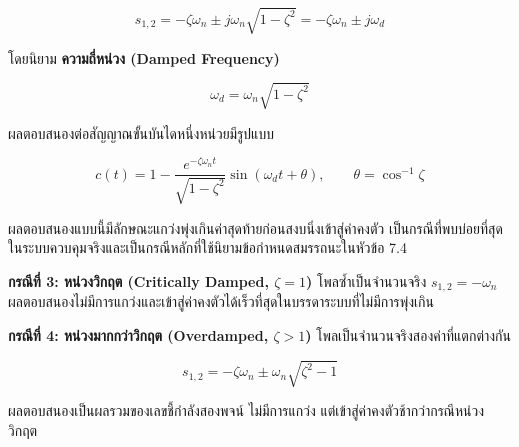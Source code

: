 \[
s_{1,2} = -\zeta\omega_n \pm j\omega_n\sqrt{1-\zeta^2} = -\zeta\omega_n \pm j\omega_d
\]

โดยนิยาม \textbf{ความถี่หน่วง (Damped Frequency)}

\[
\omega_d = \omega_n\sqrt{1-\zeta^2}
\]

ผลตอบสนองต่อสัญญาณขั้นบันไดหนึ่งหน่วยมีรูปแบบ

\[
c(t) = 1 - \frac{e^{-\zeta\omega_n t}}{\sqrt{1-\zeta^2}}\sin(\omega_d t + \theta), \qquad \theta = \cos^{-1}\zeta
\]

ผลตอบสนองแบบนี้มีลักษณะแกว่งพุ่งเกินค่าสุดท้ายก่อนสงบนิ่งเข้าสู่ค่าคงตัว เป็นกรณีที่พบบ่อยที่สุดในระบบควบคุมจริงและเป็นกรณีหลักที่ใช้นิยามข้อกำหนดสมรรถนะในหัวข้อ 7.4

\textbf{กรณีที่ 3: หน่วงวิกฤต (Critically Damped, $\zeta = 1$)}
โพลซ้ำเป็นจำนวนจริง $s_{1,2}=-\omega_n$ ผลตอบสนองไม่มีการแกว่งและเข้าสู่ค่าคงตัวได้เร็วที่สุดในบรรดาระบบที่ไม่มีการพุ่งเกิน

\textbf{กรณีที่ 4: หน่วงมากกว่าวิกฤต (Overdamped, $\zeta > 1$)}
โพลเป็นจำนวนจริงสองค่าที่แตกต่างกัน

\[
s_{1,2} = -\zeta\omega_n \pm \omega_n\sqrt{\zeta^2-1}
\]

ผลตอบสนองเป็นผลรวมของเลขชี้กำลังสองพจน์ ไม่มีการแกว่ง แต่เข้าสู่ค่าคงตัวช้ากว่ากรณีหน่วงวิกฤต


